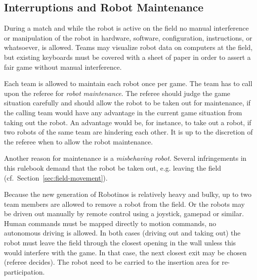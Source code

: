 \documentclass[12pt,twoside]{article}
\newcommand{\refsec}[1]{Section~\ref{#1}}
\begin{document}
\subsection{Interruptions and Robot Maintenance}
\label{sec:robot-maintenance}
During a match and while the robot is active on the field no manual
interference or manipulation of the robot in hardware, software,
configuration, instructions, or whatsoever, is allowed.  Teams may
visualize robot data on computers at the field, but existing keyboards
must be covered with a sheet of paper in order to assert a fair game
without manual interference.


Each team is allowed to maintain each robot once per game. The team
has to call upon the referee for \textit{robot maintenance}.  The
referee should judge the game situation carefully and should allow the
robot to be taken out for maintenance, if the calling team would have
any advantage in the current game situation from taking out the
robot. An advantage would be, for instance, to take out a robot, if
two robots of the same team are hindering each other. It is up to the
discretion of the referee when to allow the robot maintenance.

Another reason for maintenance is a \emph{misbehaving robot}. Several
infringements in this rulebook demand that the robot be taken out,
e.g. leaving the field (cf.~\refsec{sec:field-movement}).

Because the new generation of Robotinos is relatively heavy and bulky,
up to two team members are allowed to remove a robot from the field.
Or the robots may be driven out manually by remote control using a
joystick, gamepad or similar. Human commands must be mapped directly
to motion commands, no autonomous driving is allowed. In both cases
(driving out and taking out) the robot must leave the field through
the closest opening in the wall unless this would interfere with the
game. In that case, the next closest exit may be chosen (referee
decides). The robot need to be carried to the insertion area
for re-participation.
\end{document}

